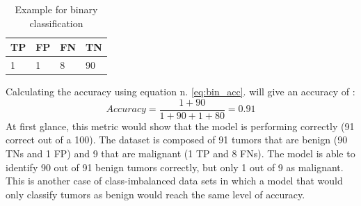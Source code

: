 \begin{table}[h]
\centering
\begin{tabular}{ p{1cm} p{2cm} p{2cm} p{2cm}}
 TP&FP&FN&TN\\
 \hline
    1 & 1& 8& 90\\
\end{tabular}
\caption{Example for binary classification}
\label{tab:tumor}
\end{table}
Calculating the accuracy using equation n. \ref{eq:bin_acc}. will give an accuracy of :
 \begin{equation}
Accuracy = \dfrac{1+90}{1+90+1+80} = 0.91
\label{eq:bin_acc2}    
  \end{equation}
At first glance, this metric would show that the model is performing correctly (91 correct out of a 100). The dataset is composed of 91 tumors that are benign (90 TNs and 1 FP) and 9 that are malignant (1 TP and 8 FNs). The model is able to identify 90 out of 91 benign tumors correctly, but only 1 out of 9 as malignant. This is another case of class-imbalanced data sets in which a model that would only classify tumors as benign would reach the same level of accuracy. \cite{google_doc}\\



